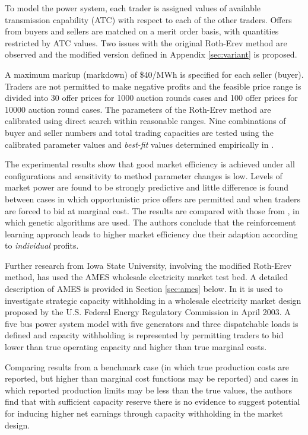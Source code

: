 To model the power system, each trader is assigned values of available
transmission capability (ATC) with respect to each of the other traders.
Offers from buyers and sellers are matched on a merit order basis, with quantities restricted by
ATC values.  Two issues with the original Roth-Erev method are observed and
the modified version defined in Appendix \ref{sec:variant} is proposed.

A maximum markup (markdown) of \$40/MWh is specified for each seller (buyer).
Traders are not permitted to make negative profits and the feasible price range
is divided into 30 offer prices for 1000 auction rounds cases and 100 offer
prices for 10000 auction round cases.  The parameters of the Roth-Erev method
are calibrated using direct search within reasonable ranges.  Nine combinations of
buyer and seller numbers and total trading capacities are tested using the
calibrated parameter values and \textit{best-fit} values determined
empirically in .

The experimental results show that good market efficiency is achieved under all
configurations and sensitivity to method parameter changes is low.  Levels of
market power are found to be strongly predictive and little difference is found
between cases in which opportunistic price offers are permitted and when traders
are forced to bid at marginal cost.  The results are compared with those from
, in which genetic algorithms are used.  The authors
conclude that the reinforcement learning approach leads to higher market
efficiency due their adaption according to \textit{individual} profits.

Further research from Iowa State University, involving the modified Roth-Erev
method, has used the AMES wholesale electricity market test bed.  A
detailed description of AMES is provided in Section \ref{sec:ames} below.  In
 it is used to investigate strategic capacity
withholding in a wholesale electricity market design proposed by the U.S.
Federal Energy Regulatory Commission in April 2003.  A five bus power system model
with five generators and three dispatchable loads is defined and capacity
withholding is represented by permitting traders to bid lower than true
operating capacity and higher than true marginal costs.

Comparing results from a benchmark case (in which true production costs are
reported, but higher than marginal cost functions may be reported) and cases in
which reported production limits may be less than the true values, the authors
find that with sufficient capacity reserve there is no evidence to suggest
potential for inducing higher net earnings through capacity withholding in the
market design.

